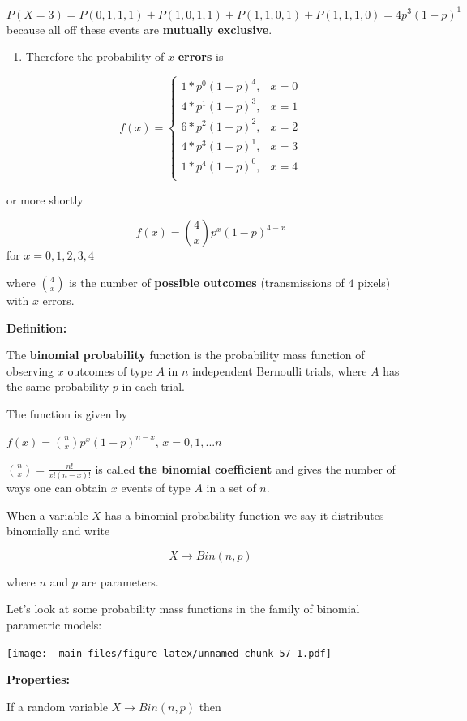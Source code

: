 \documentclass[
]{book}
\providecommand{\tightlist}{%
  \setlength{\itemsep}{0pt}\setlength{\parskip}{0pt}}
\begin{document}
\[P(X=3)=P(0,1,1,1)+P(1,0,1,1)+P(1,1,0,1)+P(1,1,1,0)=4p^3(1-p)^1\]
because all off these events are \textbf{mutually exclusive}.

\begin{enumerate}
\def\labelenumi{\arabic{enumi})}
\setcounter{enumi}{3}
\tightlist
\item
  Therefore the probability of \(x\) \textbf{errors} is
\end{enumerate}

\[
    f(x)= 
\begin{cases}
    1*p^0(1-p)^4,&  x=0 \\
    4*p^1(1-p)^3,&  x=1 \\
    6*p^2(1-p)^2,&  x=2 \\
    4*p^3(1-p)^1,&  x=3 \\
    1*p^4(1-p)^0,&  x=4 \\
\end{cases}
\]

or more shortly

\[f(x)=\binom 4 x p^x(1-p)^{4-x}\]
for \(x=0,1,2,3,4\)

where \(\binom 4 x\) is the number of \textbf{possible outcomes} (transmissions of \(4\) pixels) with \(x\) errors.

\textbf{Definition:}

The \textbf{binomial probability} function is the probability mass function of observing \(x\) outcomes of type \(A\) in \(n\) independent Bernoulli trials, where \(A\) has the same probability \(p\) in each trial.

The function is given by

\(f(x)=\binom n x p^x(1-p)^{n-x}\), \(x=0,1,...n\)

\(\binom n x= \frac{n!}{x!(n-x)!}\) is called \textbf{the binomial coefficient} and gives the number of ways one can obtain \(x\) events of type \(A\) in a set of \(n\).

When a variable \(X\) has a binomial probability function we say it distributes binomially and write

\[X\rightarrow Bin(n,p)\]

where \(n\) and \(p\) are parameters.

Let's look at some probability mass functions in the family of binomial parametric models:

\texttt{[image: \_main\_files/figure-latex/unnamed-chunk-57-1.pdf]}

\textbf{Properties:}

If a random variable \(X\rightarrow Bin(n,p)\) then
\end{document}
